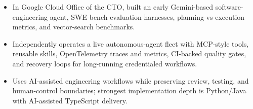 \begin{itemize}
  \item In Google Cloud Office of the CTO, built an early Gemini-based software-engineering agent, SWE-bench evaluation harnesses, planning-vs-execution metrics, and vector-search benchmarks.
  \item Independently operates a live autonomous-agent fleet with MCP-style tools, reusable skills, OpenTelemetry traces and metrics, CI-backed quality gates, and recovery loops for long-running credentialed workflows.
  \item Uses AI-assisted engineering workflows while preserving review, testing, and human-control boundaries; strongest implementation depth is Python/Java with AI-assisted TypeScript delivery.
\end{itemize}




